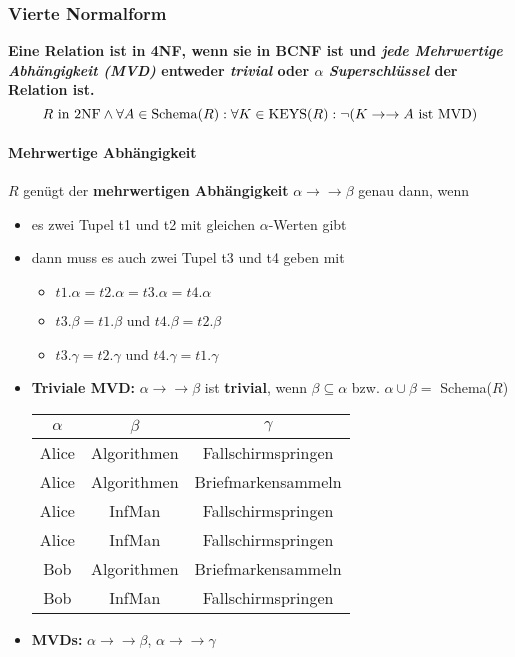 			\subsubsection{Vierte Normalform} %
                \textbf{Eine Relation ist in 4NF, wenn sie in BCNF ist und \textit{jede Mehrwertige Abhängigkeit (MVD)} entweder \textit{trivial} oder \(\alpha\) \textit{Superschlüssel} der Relation ist.}
                \begin{equation*}
                    R \text{ in 2NF} \land \forall A \in \operatorname{Schema}(R) : \forall K \in \operatorname{KEYS}(R) : \lnot(K \rightarrow \rightarrow A \text{ ist MVD})
                \end{equation*}

				\paragraph{Mehrwertige Abhängigkeit}
				\(R\) genügt der \textbf{mehrwertigen Abhängigkeit} \( \alpha \rightarrow \rightarrow \beta\) genau dann, wenn
                \begin{itemize}
					\item es zwei Tupel t1 und t2 mit gleichen \(\alpha\)-Werten gibt
					\item dann muss es auch zwei Tupel t3 und t4 geben mit
						\begin{itemize}
							\item \(t1.\alpha = t2.\alpha = t3.\alpha = t4.\alpha\)
							\item \(t3.\beta = t1.\beta\) und \(t4.\beta = t2.\beta\)
							\item \(t3.\gamma = t2.\gamma\) und \(t4.\gamma = t1.\gamma\)
						\end{itemize}
					\item \textbf{Triviale MVD:} \(\alpha \rightarrow \rightarrow \beta\) ist \textbf{trivial}, wenn \(\beta \subseteq \alpha\) bzw. \(\alpha \cup \beta =\) Schema(\(R\))
						\begin{table}[H]
							\centering
							\begin{tabular}{c | c | c}
								\(\alpha\) 	& \(\beta\)		& \(\gamma\)		  	\\ \hline
								Alice      	& Algorithmen	& Fallschirmspringen 	\\
								Alice   	& Algorithmen	& Briefmarkensammeln	\\
								Alice   	& InfMan     	& Fallschirmspringen	\\
								Alice   	& InfMan     	& Fallschirmspringen	\\
								Bob   		& Algorithmen   & Briefmarkensammeln  	\\
								Bob   		& InfMan		& Fallschirmspringen
							\end{tabular}
						\end{table}
					\item \textbf{MVDs:} \(\alpha \rightarrow \rightarrow \beta\), \(\alpha \rightarrow \rightarrow \gamma\)
				\end{itemize}

